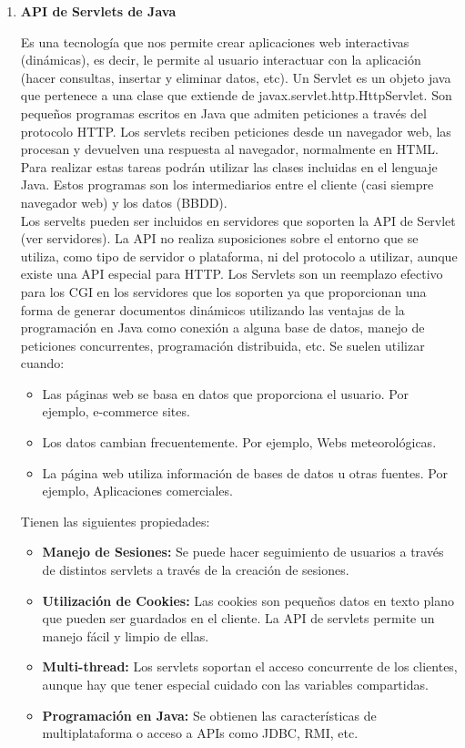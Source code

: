 \documentclass[a4paper,12pt]{article}
\begin{document}
\begin{enumerate}
 \item \textbf{API de Servlets de Java}
 
 Es una tecnología que nos permite crear aplicaciones web interactivas (dinámicas), es decir, le permite al usuario interactuar con la aplicación
 (hacer consultas, insertar y eliminar datos, etc).
 Un Servlet es un objeto java que pertenece a una clase que extiende de javax.servlet.http.HttpServlet.
 Son pequeños programas escritos en Java que admiten peticiones a través del protocolo HTTP. Los servlets reciben peticiones desde un navegador web,
 las procesan y devuelven una respuesta al navegador, normalmente en HTML. Para realizar estas tareas podrán utilizar las clases incluidas en el lenguaje Java.
 Estos programas son los intermediarios entre el cliente (casi siempre navegador web) y los datos (BBDD). \\
 Los servelts pueden ser incluidos en servidores que soporten la API de Servlet (ver servidores). La API no realiza suposiciones sobre el entorno que se utiliza,
 como tipo de servidor o plataforma, ni del protocolo a utilizar, aunque existe una API especial para HTTP. Los Servlets son un reemplazo efectivo para los CGI en
 los servidores que los soporten ya que proporcionan una forma de generar documentos dinámicos utilizando las ventajas de la programación en Java como conexión a
 alguna base de datos, manejo de peticiones concurrentes, programación distribuida, etc.
 Se suelen utilizar cuando:
 \begin{itemize}
  \item Las páginas web se basa en datos que proporciona el usuario. Por ejemplo, e-commerce sites.
  \item Los datos cambian frecuentemente. Por ejemplo, Webs meteorológicas.
  \item La página web utiliza información de bases de datos u otras fuentes. Por ejemplo, Aplicaciones comerciales.
 \end{itemize}
 Tienen las siguientes propiedades:
 \begin{itemize}
  \item \textbf{Manejo de Sesiones:} Se puede hacer seguimiento de usuarios a través de distintos servlets a través de la creación de sesiones.
  \item \textbf{Utilización de Cookies:} Las cookies son pequeños datos en texto plano que pueden ser guardados en el cliente. La API de servlets permite un manejo fácil y limpio de ellas.
  \item \textbf{Multi-thread:} Los servlets soportan el acceso concurrente de los clientes, aunque hay que tener especial cuidado con las variables compartidas.
  \item \textbf{Programación en Java:} Se obtienen las características de multiplataforma o acceso a APIs como JDBC, RMI, etc.
 \end{itemize}


\end{enumerate}
\end{document}
